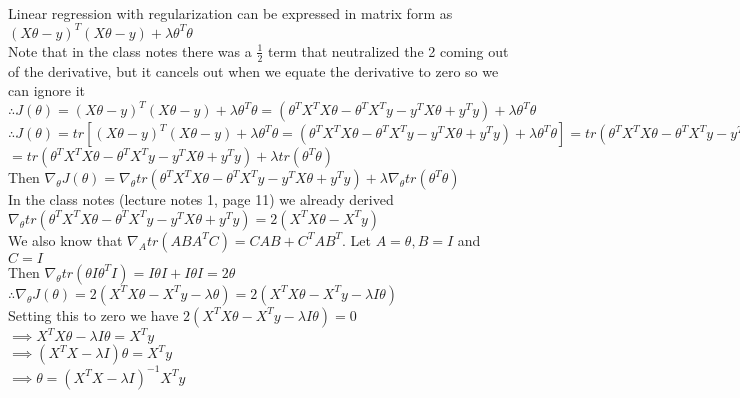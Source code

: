 \begin{answer}\\
Linear regression with regularization can be expressed in matrix form as \\
$(X\theta-y)^T (X\theta-y)+\lambda \theta^T \theta$\\
Note that in the class notes there was a $\frac{1}{2}$ term that neutralized the 2 coming out of the derivative, but it cancels out when we equate the derivative to zero so we can ignore it\\
$\therefore J(\theta)=(X\theta-y)^T (X\theta-y)+\lambda \theta^T \theta=(\theta^TX^TX \theta-\theta^TX^Ty -y^TX\theta+y^Ty) + \lambda \theta^T \theta$\\
$\therefore J(\theta)=tr \left [(X\theta-y)^T (X\theta-y)+\lambda \theta^T \theta=(\theta^TX^TX \theta-\theta^TX^Ty -y^TX\theta+y^Ty) + \lambda \theta^T \theta \right ]=tr(\theta^TX^TX \theta-\theta^TX^Ty -y^TX\theta+y^Ty) + tr(\lambda \theta^T \theta)$\\
$=tr(\theta^TX^TX \theta-\theta^TX^Ty -y^TX\theta+y^Ty) + \lambda tr(\theta^T \theta)$\\
Then $\nabla_{\theta}J(\theta)=\nabla_{\theta}tr(\theta^TX^TX \theta-\theta^TX^Ty -y^TX\theta+y^Ty)+\lambda \nabla_{\theta} tr(\theta^T \theta)$\\
In the class notes (lecture notes 1, page 11) we already derived $\nabla_{\theta}tr(\theta^TX^TX \theta-\theta^TX^Ty -y^TX\theta+y^Ty) = 2(X^TX\theta - X^Ty)$\\
We also know that $\nabla_{A} tr(ABA^TC)=CAB+C^TAB^T$. Let $A=\theta, B=I$ and $C=I$\\
Then $\nabla_{\theta}tr(\theta I \theta^T I)=I \theta I+ I \theta I = 2 \theta$\\
$\therefore \nabla_{\theta}J(\theta)=2(X^TX\theta - X^Ty - \lambda \theta)=2(X^TX\theta - X^Ty - \lambda I \theta)$\\
Setting this to zero we have
$2(X^TX\theta - X^Ty - \lambda I \theta)=0$\\
$\implies X^TX\theta  - \lambda I \theta= X^Ty$\\
$\implies (X^TX-\lambda I) \theta=X^Ty$\\
$\implies \theta=(X^TX-\lambda I)^{-1}X^Ty$\\
\end{answer}
